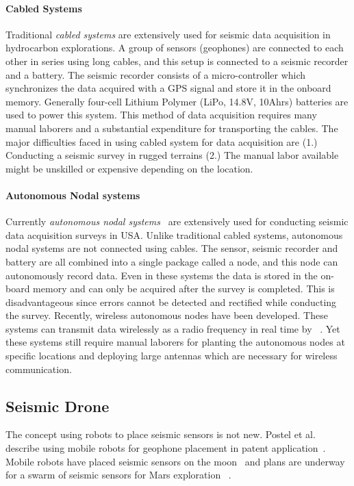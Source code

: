 \paragraph{Cabled Systems}

 Traditional \emph{cabled systems} are extensively used for seismic data acquisition in hydrocarbon explorations. A group of sensors (geophones) are connected to each other in series using long cables, and this setup is connected to a seismic recorder and a battery. The seismic recorder consists of a micro-controller which synchronizes the data acquired with a GPS signal and store it in the onboard memory. Generally four-cell Lithium Polymer (LiPo, 14.8V, 10Ahrs) batteries are used to power this system. This method of data acquisition requires many manual laborers and a substantial expenditure for transporting the cables. The major difficulties faced in using cabled system for data acquisition are (1.) Conducting a seismic survey in rugged terrains (2.) The manual labor available might be unskilled or expensive depending on the location.  
 
 \paragraph{Autonomous Nodal systems}

 Currently \emph{autonomous nodal systems}~\cite{wood1998distributed} are extensively used for conducting seismic data acquisition surveys in USA. Unlike traditional cabled systems, autonomous nodal systems are not connected using cables. The sensor, seismic recorder and battery are all combined into a single package called a node, and this node can autonomously record data. Even in these systems the data is stored in the on-board memory and can only be acquired after the survey is completed. This is disadvantageous since errors cannot be detected and rectified while conducting the survey. Recently, wireless autonomous nodes have been developed. These systems can transmit data wirelessly as a radio frequency in real time by ~\cite{jiang2015geophysical}. Yet these systems still require manual laborers for planting the autonomous nodes at specific locations and deploying large antennas which are necessary for wireless communication.
 
\subsection{Seismic Drone}  

The concept using robots to place seismic sensors is not new.  Postel et al. describe using mobile robots for geophone placement in patent application~\cite{DSSMaA14}.  Mobile robots have placed seismic sensors on the moon~\cite{LSisMSE81} and plans are underway for a swarm of seismic sensors for Mars exploration ~\cite{MAPL2006}.

